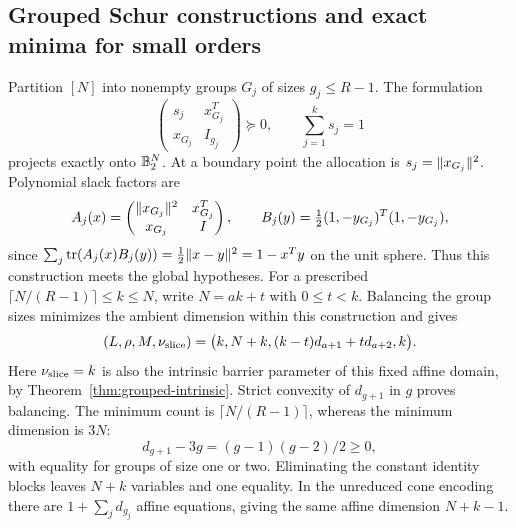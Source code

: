\subsection{Grouped Schur constructions and exact minima for small orders}
Partition $[N]$ into nonempty groups $G_j$ of sizes $g_j\leq R-1$.
The formulation
\begin{equation}\label{res:schur}
 \begin{pmatrix}s_j&x_{G_j}^T\\x_{G_j}&I_{g_j}\end{pmatrix}\succeq0,
 \qquad \sum_{j=1}^k s_j=1
\end{equation}
projects exactly onto $\mathbb B_2^N$. At a boundary point the allocation is
$s_j=\lVert x_{G_j}\rVert^2$. Polynomial slack factors are
\[
 A_j(x)=\begin{pmatrix}\lVert x_{G_j}\rVert^2&x_{G_j}^T\\x_{G_j}&I\end{pmatrix},
 \qquad B_j(y)=\tfrac12(1,-y_{G_j})^T(1,-y_{G_j}),
\]
since $\sum_j\operatorname{tr}(A_j(x)B_j(y))=\tfrac12\lVert x-y\rVert^2=1-x^Ty$
on the unit sphere. Thus this construction meets the global hypotheses.
For a prescribed $\lceil N/(R-1)\rceil\leq k\leq N$, write
$N=ak+t$ with $0\leq t<k$. Balancing the group sizes minimizes the
ambient dimension within this construction and gives
\begin{equation}\label{res:schur-ledger}
 (L,\rho,M,\nu_{\rm slice})
 =\bigl(k,N+k,(k-t)d_{a+1}+td_{a+2},k\bigr).
\end{equation}
Here $\nu_{\rm slice}=k$ is also the intrinsic barrier parameter of this
fixed affine domain, by Theorem~\ref{thm:grouped-intrinsic}. Strict convexity
of $d_{g+1}$ in $g$ proves balancing. The minimum count is
$\lceil N/(R-1)\rceil$, whereas the minimum dimension is $3N$:
\[
 d_{g+1}-3g=(g-1)(g-2)/2\geq0,
\]
with equality for groups of size one or two. Eliminating the constant
identity blocks leaves $N+k$ variables and one equality. In the unreduced cone encoding
there are $1+\sum_jd_{g_j}$ affine equations, giving the same affine
dimension $N+k-1$.

